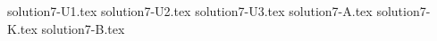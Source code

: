 \documentclass{article}
\begin{document}
{solution7-U1.tex}
{solution7-U2.tex}
{solution7-U3.tex}
{solution7-A.tex}
{solution7-K.tex}
{solution7-B.tex}
\end{document}

